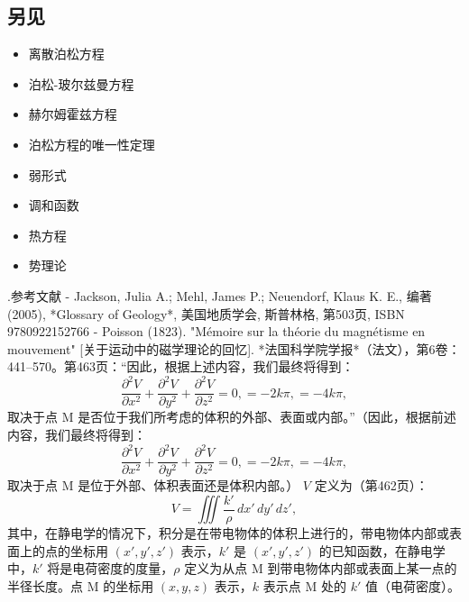 \subsection{另见}  
\begin{itemize}
\item 离散泊松方程  
\item 泊松-玻尔兹曼方程  
\item 赫尔姆霍兹方程  
\item 泊松方程的唯一性定理  
\item 弱形式  
\item 调和函数  
\item 热方程  
\item 势理论
\end{itemize}
.参考文献  
- Jackson, Julia A.; Mehl, James P.; Neuendorf, Klaus K. E., 编著 (2005), *Glossary of Geology*, 美国地质学会, 斯普林格, 第503页, ISBN 9780922152766  
- Poisson (1823). "Mémoire sur la théorie du magnétisme en mouvement" [关于运动中的磁学理论的回忆]. *法国科学院学报*（法文），第6卷：441–570。第463页：“因此，根据上述内容，我们最终将得到：  
\[
\frac{\partial^2 V}{\partial x^2} + \frac{\partial^2 V}{\partial y^2} + \frac{\partial^2 V}{\partial z^2} = 0, = -2k\pi, = -4k\pi,
\]
取决于点 M 是否位于我们所考虑的体积的外部、表面或内部。”（因此，根据前述内容，我们最终将得到：  
\[
\frac{\partial^2 V}{\partial x^2} + \frac{\partial^2 V}{\partial y^2} + \frac{\partial^2 V}{\partial z^2} = 0, = -2k\pi, = -4k\pi,
\]
取决于点 M 是位于外部、体积表面还是体积内部。）  
\(V\) 定义为（第462页）：  
\[
V = \iiint \frac{k'}{\rho} \, dx' \, dy' \, dz',
\]
其中，在静电学的情况下，积分是在带电物体的体积上进行的，带电物体内部或表面上的点的坐标用 \((x', y', z')\) 表示，\(k'\) 是 \( (x', y', z') \) 的已知函数，在静电学中，\(k'\) 将是电荷密度的度量，\(\rho\) 定义为从点 M 到带电物体内部或表面上某一点的半径长度。点 M 的坐标用 \((x, y, z)\) 表示，\(k\) 表示点 M 处的 \(k'\) 值（电荷密度）。